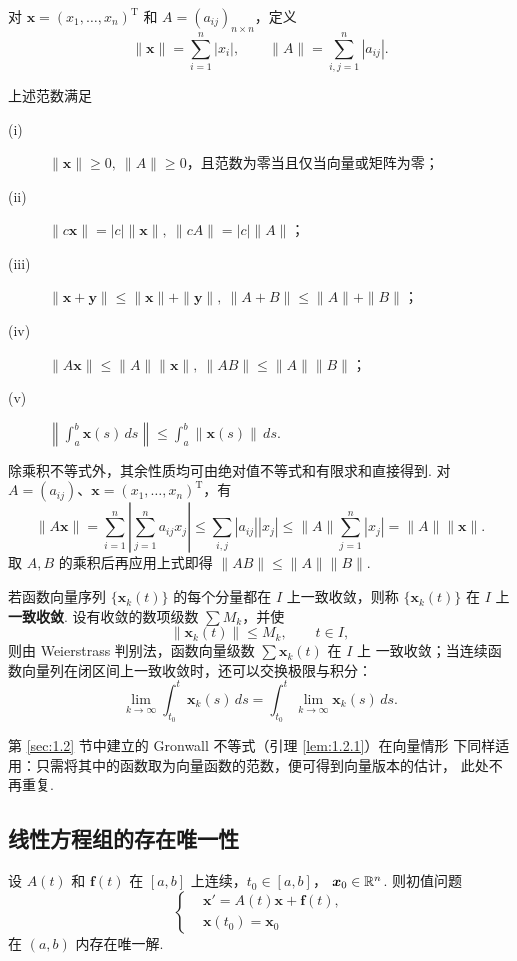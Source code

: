对
$\bm{x}=(x_1,\ldots,x_n)^\mathrm{T}$ 和 $A=(a_{ij})_{n\times n}$，定义
\begin{equation}\label{equ:4.7}
\|\bm{x}\|=\sum_{i=1}^n|x_i|,
\qquad
\|A\|=\sum_{i,j=1}^n|a_{ij}|.
\end{equation}

\begin{prop}\label{prop:4.1.2}
上述范数满足
\begin{description}
\item[(i)] $\|\bm{x}\|\ge0,\ \|A\|\ge0$，且范数为零当且仅当向量或矩阵为零；
\item[(ii)] $\|c\bm{x}\|=|c|\|\bm{x}\|,\ \|cA\|=|c|\|A\|$；
\item[(iii)] $\|\bm{x}+\bm{y}\|\le\|\bm{x}\|+\|\bm{y}\|,\
\|A+B\|\le\|A\|+\|B\|$；
\item[(iv)] $\|A\bm{x}\|\le\|A\|\|\bm{x}\|,\
\|AB\|\le\|A\|\|B\|$；
\item[(v)]
$\left\|\int_a^b\bm{x}(s)\,ds\right\|\le\int_a^b\|\bm{x}(s)\|\,ds$.
\end{description}
\end{prop}

\begin{pf1}
除乘积不等式外，其余性质均可由绝对值不等式和有限求和直接得到. 对
$A=(a_{ij})$、$\bm{x}=(x_1,\ldots,x_n)^\mathrm{T}$，有
\[
\|A\bm{x}\|
=\sum_{i=1}^n\left|\sum_{j=1}^n a_{ij}x_j\right|
\le\sum_{i,j}|a_{ij}||x_j|
\le\|A\|\sum_{j=1}^n|x_j|
=\|A\|\|\bm{x}\|.
\]
取 $A,B$ 的乘积后再应用上式即得 $\|AB\|\le\|A\|\|B\|$.
\end{pf1}

若函数向量序列 $\{\bm{x}_k(t)\}$ 的每个分量都在 $I$ 上一致收敛，则称
$\{\bm{x}_k(t)\}$ 在 $I$ 上\textbf{一致收敛}. 设有收敛的数项级数
$\sum M_k$，并使
\[
\|\bm{x}_k(t)\|\le M_k,\qquad t\in I,
\]
则由 Weierstrass 判别法，函数向量级数 $\sum\bm{x}_k(t)$ 在 $I$ 上
一致收敛；当连续函数向量列在闭区间上一致收敛时，还可以交换极限与积分：
\[
\lim_{k\to\infty}\int_{t_0}^{t}\bm{x}_k(s)\,ds
=\int_{t_0}^{t}\lim_{k\to\infty}\bm{x}_k(s)\,ds.
\]

第 \ref{sec:1.2} 节中建立的 Gronwall 不等式（引理 \ref{lem:1.2.1}）在向量情形
下同样适用：只需将其中的函数取为向量函数的范数，便可得到向量版本的估计，
此处不再重复.

\subsection{线性方程组的存在唯一性}

\begin{thm}\label{thm:4.1.1}
设 $A(t)$ 和 $\bm{f}(t)$ 在 $[a,b]$ 上连续，$t_0\in[a,b]$，
$\bm{x}_0\in\mathbb{R}^n$. 则初值问题
\begin{equation}\label{equ:4.8}
\left\{
\begin{aligned}
&\bm{x}'=A(t)\bm{x}+\bm{f}(t),\\
&\bm{x}(t_0)=\bm{x}_0
\end{aligned}
\right.
\end{equation}
在 $(a,b)$ 内存在唯一解.
\end{thm}

